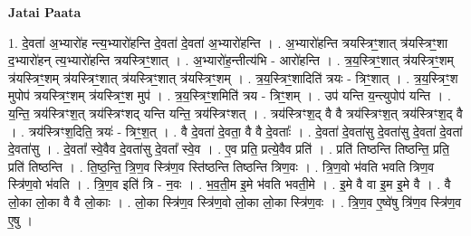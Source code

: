 \documentclass[17pt]{extarticle}
\begin{document}
\textbf{Jatai Paata} \newline

1. दे॒वता॑ अ॒भ्यारो॑ह न्त्य॒भ्यारो॑हन्ति दे॒वता॑ दे॒वता॑ अ॒भ्यारो॑हन्ति । . अ॒भ्यारो॑हन्ति त्रयस्त्रिꣳ॒॒शात् त्र॑यस्त्रिꣳ॒॒शा द॒भ्यारो॑हन् त्य॒भ्यारो॑हन्ति त्रयस्त्रिꣳ॒॒शात् । . अ॒भ्यारो॑ह॒न्तीत्य॑भि - आरो॑हन्ति । . त्र॒य॒स्त्रिꣳ॒॒शात् त्र॑यस्त्रिꣳ॒॒शम् त्र॑यस्त्रिꣳ॒॒शम् त्र॑यस्त्रिꣳ॒॒शात् त्र॑यस्त्रिꣳ॒॒शात् त्र॑यस्त्रिꣳ॒॒शम् । . त्र॒य॒स्त्रिꣳ॒॒शादिति॑ त्रयः - त्रिꣳ॒॒शात् । . त्र॒य॒स्त्रिꣳ॒॒श मुपोप॑ त्रयस्त्रिꣳ॒॒शम् त्र॑यस्त्रिꣳ॒॒श मुप॑ । . त्र॒य॒स्त्रिꣳ॒॒शमिति॑ त्रय - त्रिꣳ॒॒शम् । . उप॑ यन्ति य॒न्त्युपोप॑ यन्ति । . य॒न्ति॒ त्रय॑स्त्रिꣳश॒त् त्रय॑स्त्रिꣳशद् यन्ति यन्ति॒ त्रय॑स्त्रिꣳशत् । . त्रय॑स्त्रिꣳश॒द् वै वै त्रय॑स्त्रिꣳश॒त् त्रय॑स्त्रिꣳश॒द् वै । . त्रय॑स्त्रिꣳश॒दिति॒ त्रयः॑ - त्रिꣳ॒॒श॒त् । . वै दे॒वता॑ दे॒वता॒ वै वै दे॒वताः᳚ । . दे॒वता॑ दे॒वता॑सु दे॒वता॑सु दे॒वता॑ दे॒वता॑ दे॒वता॑सु । . दे॒वता᳚ स्वे॒वैव दे॒वता॑सु दे॒वता᳚ स्वे॒व । . ए॒व प्रति॒ प्रत्ये॒वैव प्रति॑ । . प्रति॑ तिष्ठन्ति तिष्ठन्ति॒ प्रति॒ प्रति॑ तिष्ठन्ति । . ति॒ष्ठ॒न्ति॒ त्रि॒ण॒व स्त्रि॑ण॒व स्ति॑ष्ठन्ति तिष्ठन्ति त्रिण॒वः । . त्रि॒ण॒वो भ॑वति भवति त्रिण॒व स्त्रि॑ण॒वो भ॑वति । . त्रि॒ण॒व इति॑ त्रि - न॒वः । . भ॒व॒ती॒म इ॒मे भ॑वति भवती॒मे । . इ॒मे वै वा इ॒म इ॒मे वै । . वै लो॒का लो॒का वै वै लो॒काः । . लो॒का स्त्रि॑ण॒व स्त्रि॑ण॒वो लो॒का लो॒का स्त्रि॑ण॒वः । . त्रि॒ण॒व ए॒ष्वे॑षु त्रि॑ण॒व स्त्रि॑ण॒व ए॒षु । \newline
\end{document}
